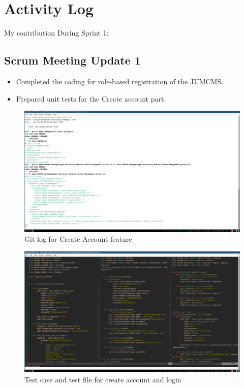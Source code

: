 \documentclass[a4paper,12pt]{article}
\begin{document}
\section{Activity Log}
My contribution During Sprint 1:
\subsection{Scrum Meeting Update 1}
\begin{itemize}
    \item Completed the coding for role-based registration of the JUMCMS.
    \item Prepared unit tests for the Create account part.
\end{itemize}
\begin{figure}[H]
    \centering
    \includegraphics[width=1\textwidth]{images/scr1out1.png}
    \caption{Git log for Create Account feature}
    \label{fig:gitlogcreateaccount}
\end{figure}

\begin{figure}[H]
    \centering
    \includegraphics[width=1\textwidth]{images/scr1out2.png}
    \caption{Test case and test file for create account and login}
    \label{fig:testcreateaccount}
\end{figure}
\end{document}
